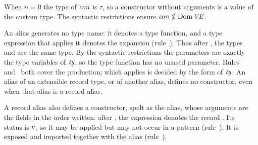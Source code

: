 \begin{rulecomments}
 When $n = 0$ the type of $\mathit{con}$ is $\tau$, so a
constructor without arguments is a value of the custom type. The syntactic
restrictions ensure $\mathit{con} \notin \mathrm{Dom}\,\mathit{VE}$.
\end{rulecomments}




\begin{rulecomments}
 An alias generates no type name: it denotes a type
function, and a type expression that applies it denotes the expansion
(rule~). Thus after , the types
 and  are the same type. By the syntactic restrictions the
parameters are exactly the type variables of $\mathit{ty}$, so the type function has no
unused parameter. Rules~
and~ both cover the production; which applies is
decided by the form of $\mathit{ty}$. An alias of an extensible record type, or of
another alias, defines no constructor, even when that alias is a record alias.

 A record alias also defines a constructor,
spelt as the alias, whose arguments are the fields in the order written: after
, the expression 
denotes the record . Its status is $\mathrm{v}$, so it
may be applied but may not occur in a pattern (rule~).
It is exposed and imported together with the alias
(rule~).
\end{rulecomments}

